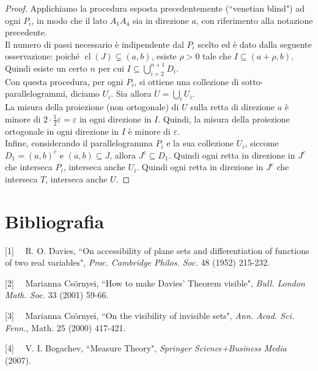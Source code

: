 \documentclass[a4paper, twoside]{article}
\newcommand{\<}{\langle}
\renewcommand{\>}{\rangle}
\begin{document}
\begin{proof}
	Applichiamo la procedura esposta precedentemente (``venetian blind") ad ogni $P_i$, in modo che il lato $A_1A_4$ sia in direzione $a$, con riferimento alla notazione precedente.\\
	Il numero di passi necessario è indipendente dal $P_i$ scelto ed è dato dalla seguente osservazione: poiché $\operatorname{cl}(J) \subsetneq(a, b)$, esiste $\rho >0$ tale che $I \subseteq (a+\rho,b)$. Quindi esiste un certo $n$ per cui $I \subseteq \bigcup_{i=2}^{n+1}D_i$.\\
	Con questa procedura, per ogni $P_i$, si ottiene una collezione di sotto-parallelogrammi, diciamo $U_i$. Sia allora $U = \bigcup_i U_i$.\\
	La misura della proiezione (non ortogonale) di $U$ sulla retta di direzione $a$ è minore di $2 \cdot \frac{1}{2} \varepsilon=\varepsilon$ in ogni direzione in $I$. Quindi, la misura della proiezione ortogonale in ogni direzione in $I$ è minore di $\varepsilon$.\\
	Infine, considerando il parallelogramma $P_i$ e la sua collezione $U_i$, siccome $D_1 =(a,b)^c$ e $(a,b) \subseteq J$, allora $J^c \subseteq D_1$. Quindi ogni retta in direzione in $J^c$ che interseca $P_i$, interseca anche $U_i$. Quindi ogni retta in direzione in $J^c$ che interseca $T$, interseca anche $U$. 
\end{proof}

\newpage

\section{Bibliografia}

[1] \ \ R. O. Davies, ``On accessibility of plane sets and differentiation
of functions of two real variables", \emph{Proc. Cambridge Philos. Soc.} 48 (1952) 215-232.

[2] \ \ Marianna Cs\"{o}rnyei, ``How to make Davies' Theorem visible", \emph{Bull. London Math. Soc.} 33 (2001) 59-66.

[3] \ \ Marianna Cs\"{o}rnyei, ``On the visibility of invisible sets",
\emph{Ann. Acad. Sci. Fenn.}, Math. 25 (2000) 417-421.

[4] \ \ V. I. Bogachev, ``Measure Theory", \emph{Springer Science+Business Media} (2007). 
\end{document}
